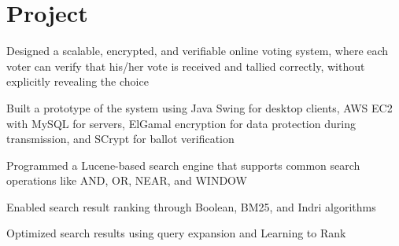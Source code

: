 \documentclass[]{deedy-resume-openfont}
\begin{document}
\begin{minipage}[t]{0.64\textwidth}

\section{Project}
\descript{}
\begin{tightemize}
\item Designed a scalable, encrypted, and verifiable online voting system, where each voter can verify that his/her vote is received and tallied correctly, without explicitly revealing the choice
\item Built a prototype of the system using Java Swing for desktop clients, AWS EC2 with MySQL for servers, ElGamal encryption for data protection during transmission, and SCrypt for ballot verification
\end{tightemize}
\sectionsep

\descript{}
\begin{tightemize}
\item Programmed a Lucene-based search engine that supports common search operations like AND, OR, NEAR, and WINDOW
\item Enabled search result ranking through Boolean, BM25, and Indri algorithms
\item Optimized search results using query expansion and Learning to Rank
\end{tightemize}
\sectionsep


\end{minipage} 
\end{document}
